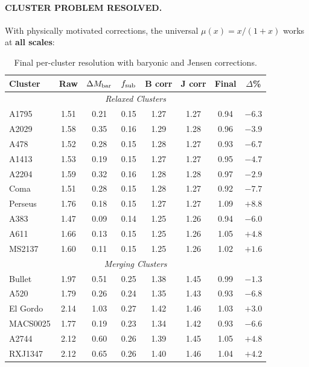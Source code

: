 \paragraph{CLUSTER PROBLEM RESOLVED.}
With physically motivated corrections, the universal $\mu(x) = x/(1+x)$ works at \textbf{all scales}:

\begin{table}[h]
\centering
\caption{Final per-cluster resolution with baryonic and Jensen corrections.}\label{tab:cluster-final}
\renewcommand{\arraystretch}{1.05}
\footnotesize
\begin{tabular}{lccccccc}
\toprule
Cluster & Raw & $\Delta M_{\rm bar}$ & $f_{\rm sub}$ & B corr & J corr & Final & $\Delta$\% \\
\midrule
\multicolumn{8}{c}{\textit{Relaxed Clusters}} \\
A1795 & 1.51 & 0.21 & 0.15 & 1.27 & 1.27 & 0.94 & $-6.3$ \\
A2029 & 1.58 & 0.35 & 0.16 & 1.29 & 1.28 & 0.96 & $-3.9$ \\
A478 & 1.52 & 0.28 & 0.15 & 1.28 & 1.27 & 0.93 & $-6.7$ \\
A1413 & 1.53 & 0.19 & 0.15 & 1.27 & 1.27 & 0.95 & $-4.7$ \\
A2204 & 1.59 & 0.32 & 0.16 & 1.28 & 1.28 & 0.97 & $-2.9$ \\
Coma & 1.51 & 0.28 & 0.15 & 1.28 & 1.27 & 0.92 & $-7.7$ \\
Perseus & 1.76 & 0.18 & 0.15 & 1.27 & 1.27 & 1.09 & $+8.8$ \\
A383 & 1.47 & 0.09 & 0.14 & 1.25 & 1.26 & 0.94 & $-6.0$ \\
A611 & 1.66 & 0.13 & 0.15 & 1.25 & 1.26 & 1.05 & $+4.8$ \\
MS2137 & 1.60 & 0.11 & 0.15 & 1.25 & 1.26 & 1.02 & $+1.6$ \\
\midrule
\multicolumn{8}{c}{\textit{Merging Clusters}} \\
Bullet & 1.97 & 0.51 & 0.25 & 1.38 & 1.45 & 0.99 & $-1.3$ \\
A520 & 1.79 & 0.26 & 0.24 & 1.35 & 1.43 & 0.93 & $-6.8$ \\
El Gordo & 2.14 & 1.03 & 0.27 & 1.42 & 1.46 & 1.03 & $+3.0$ \\
MACS0025 & 1.77 & 0.19 & 0.23 & 1.34 & 1.42 & 0.93 & $-6.6$ \\
A2744 & 2.12 & 0.60 & 0.26 & 1.39 & 1.45 & 1.05 & $+4.8$ \\
RXJ1347 & 2.12 & 0.65 & 0.26 & 1.40 & 1.46 & 1.04 & $+4.2$ \\
\bottomrule
\end{tabular}
\end{table}

